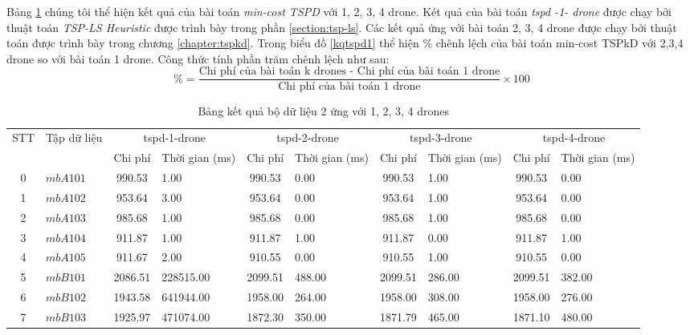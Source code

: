 \documentclass[a4paper,12pt]{report}
\begin{document}
Bảng \ref{tabletspkd1} chúng tôi thể hiện kết quả của bài toán \textit{min-cost TSPD} với 1, 2, 3, 4 drone. Két quả của bài toán \textit{tspd -1- drone } được chạy bởi thuật toán \textit{TSP-LS Heuristic} được trình bày trong phần \ref{section:tsp-ls}. Các kết quả ứng với bài toán 2, 3, 4 drone được chạy bởi thuật toán được trình bày trong chương \ref{chapter:tspkd}. Trong biểu đồ \ref{kqtspd1} thể hiện \% chênh lệch của bài toán min-cost TSPkD với 2,3,4 drone so với bài toán 1 drone. Công thức tính phần trăm chênh lệch như sau:
$$\%=\frac{\text{Chi phí của bài toán k drones - Chi phí của bài toán 1 drone}}{\text{Chi phí của bài toán 1 drone}} \times 100$$ 
\footnotesize
\begin{longtable}{|c|l|c|p{1.5cm}|c|p{1cm}|c|p{1cm}|c|p{1cm}|}
\caption{Bảng kết quả bộ dữ liệu 2 ứng với 1, 2, 3, 4 drones}
\label{tabletspkd1}\\ 
\toprule
STT&\multirow{2}{*}{Tập dữ liệu} & \multicolumn{2}{c|}{tspd-1-drone } &\multicolumn{2}{c|}{tspd-2-drone } &\multicolumn{2}{c|}{tspd-3-drone }&\multicolumn{2}{c|}{tspd-4-drone } \\
\cline{3-10} 
&&Chi phí &Thời gian (ms)&Chi phí &Thời gian (ms)&Chi phí &Thời gian (ms)&Chi phí &Thời gian (ms)\\
\midrule
        \toprule
0&$mbA101$ &     990.53 &      1.00 &     990.53 &       0.00 &     990.53 &       1.00 &     990.53 &       0.00\\ \hline 
1&$mbA102$ &     953.64 &      3.00 &     953.64 &       0.00 &     953.64 &       1.00 &     953.64 &       0.00\\ \hline 
2&$mbA103$ &     985.68 &      1.00 &     985.68 &       0.00 &     985.68 &       1.00 &     985.68 &       0.00\\ \hline 
3&$mbA104$ &     911.87 &      1.00 &     911.87 &       1.00 &     911.87 &       0.00 &     911.87 &       1.00\\ \hline 
4&$mbA105$ &     911.67 &      2.00 &     910.55 &       0.00 &     910.55 &       1.00 &     910.55 &       0.00\\ \hline 
5&$mbB101$ &    2086.51 & 228515.00 &    2099.51 &     488.00 &    2099.51 &     286.00 &    2099.51 &     382.00\\ \hline 
6&$mbB102$ &    1943.58 & 641944.00 &    1958.00 &     264.00 &    1958.00 &     308.00 &    1958.00 &     276.00\\ \hline 
7&$mbB103$ &    1925.97 & 471074.00 &    1872.30 &     350.00 &    1871.79 &     465.00 &    1871.10 &     480.00\\ \hline 

\end{longtable}
\end{document}
